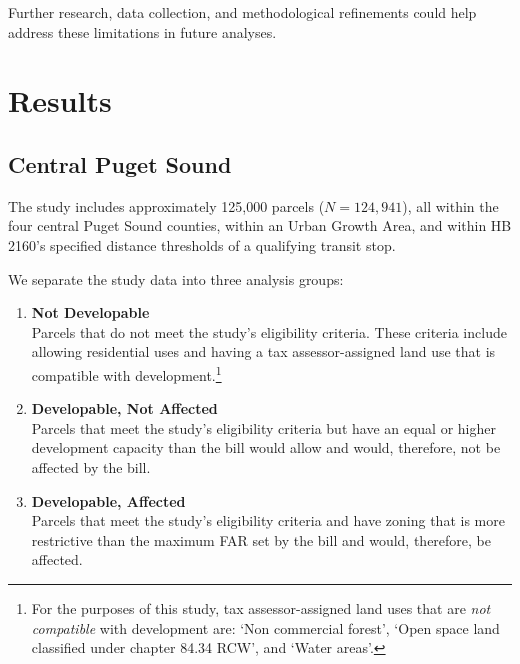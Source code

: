 \documentclass[
]{agujournal2019}
\begin{document}
Further research, data collection, and methodological refinements could
help address these limitations in future analyses.

\section{Results}\label{results}

\subsection{Central Puget Sound}\label{central-puget-sound}

The study includes approximately 125,000 parcels (\(N = 124,941\)), all
within the four central Puget Sound counties, within an Urban Growth
Area, and within HB 2160's specified distance thresholds of a qualifying
transit stop.

We separate the study data into three analysis groups:

\begin{enumerate}
\def\labelenumi{\arabic{enumi}.}
\item
  \textbf{Not Developable}\\
  Parcels that do not meet the study's eligibility criteria. These
  criteria include allowing residential uses and having a tax
  assessor-assigned land use that is compatible with
  development.\footnote{For the purposes of this study, tax
    assessor-assigned land uses that are \emph{not compatible} with
    development are: `Non commercial forest', `Open space land
    classified under chapter 84.34 RCW', and `Water areas'.}
\item
  \textbf{Developable, Not Affected}\\
  Parcels that meet the study's eligibility criteria but have an equal
  or higher development capacity than the bill would allow and would,
  therefore, not be affected by the bill.
\item
  \textbf{Developable, Affected}\\
  Parcels that meet the study's eligibility criteria and have zoning
  that is more restrictive than the maximum FAR set by the bill and
  would, therefore, be affected.
\end{enumerate}
\end{document}
